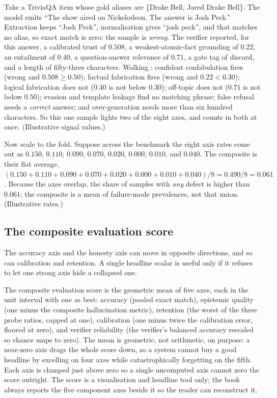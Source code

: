 \begin{workedexample}
Take a TriviaQA item whose gold aliases are \{Drake Bell, Jared Drake Bell\}. The model
emits ``The show aired on Nickelodeon. The answer is Josh Peck.'' Extraction keeps ``Josh
Peck'', normalisation gives ``josh peck'', and that matches no alias, so exact match is
zero: the sample is \emph{wrong}. The verifier reported, for this answer, a calibrated
trust of $0.508$, a weakest-atomic-fact grounding of $0.22$, an entailment of $0.40$, a
question-answer relevance of $0.71$, a gate tag of discard, and a length of fifty-three
characters. Walking : confident confabulation fires (wrong and
$0.508 \ge 0.50$); factual fabrication fires (wrong and $0.22 < 0.30$); logical
fabrication does not ($0.40$ is not below $0.30$); off-topic does not ($0.71$ is not
below $0.50$); evasion and template leakage find no matching phrase; false refusal needs
a \emph{correct} answer; and over-generation needs more than six hundred characters. So
this one sample lights two of the eight axes, and counts in both at once. (Illustrative
signal values.)

Now scale to the fold. Suppose across the benchmark the eight axis rates come out as
$0.150$, $0.110$, $0.090$, $0.070$, $0.020$, $0.000$, $0.010$, and $0.040$. The composite
is their flat average, $(0.150+0.110+0.090+0.070+0.020+0.000+0.010+0.040)/8 = 0.490/8 =
0.061$. Because the axes overlap, the share of samples with \emph{any} defect is higher
than $0.061$; the composite is a mean of failure-mode prevalences, not that union.
(Illustrative rates.)
\end{workedexample}

\subsection*{The composite evaluation score}

The accuracy axis and the honesty axis can move in opposite directions, and so can
calibration and retention. A single headline scalar is useful only if it refuses to
let one strong axis hide a collapsed one.

\begin{precise}
The composite evaluation score is the geometric mean of five axes, each in the unit
interval with one as best: accuracy (pooled exact match), epistemic quality (one
minus the composite hallucination metric), retention (the worst of the three probe
ratios, capped at one), calibration (one minus twice the calibration error, floored
at zero), and verifier reliability (the verifier's balanced accuracy rescaled so
chance maps to zero). The mean is geometric, not arithmetic, on purpose: a near-zero
axis drags the whole score down, so a system cannot buy a good headline by excelling
on four axes while catastrophically forgetting on the fifth. Each axis is clamped
just above zero so a single uncomputed axis cannot zero the score outright. The score
is a visualisation and headline tool only; the book always reports the five component
axes beside it so the reader can reconstruct it.
\end{precise}

